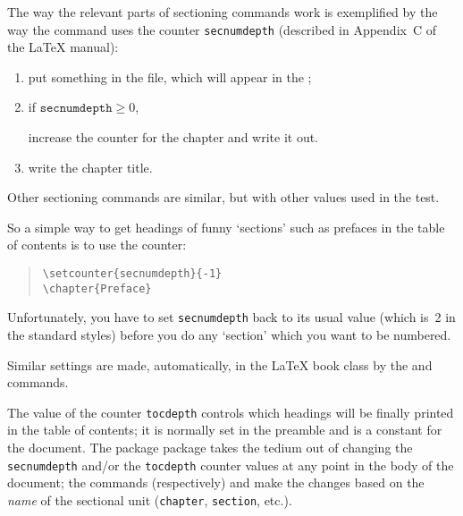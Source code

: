 
The way the relevant parts of sectioning commands work is exemplified
by the way the  command uses the counter \texttt{secnumdepth}
(described in Appendix~C of the \LaTeX{} manual):
\begin{enumerate}
\item put something in the  file, which will appear in
  the ;
\htmlignore 
\item if \ensuremath{\texttt{secnumdepth} \geq 0},
\endhtmlignore
{}
  increase the counter for the chapter and write it out.
\item write the chapter title.
\end{enumerate}
Other sectioning commands are similar, but with other values used in
the test.

So a simple way to get headings of funny `sections' such as prefaces
in the table of contents is to use the counter:
\begin{quote}
\begin{verbatim}
\setcounter{secnumdepth}{-1}
\chapter{Preface}
\end{verbatim}
\end{quote}
Unfortunately, you have to set \texttt{secnumdepth} back to its usual
value (which is~2 in the standard styles) before you do any `section'
which you want to be numbered.

Similar settings are made, automatically, in the \LaTeX{} book class by
the  and  commands.

The value of the counter \texttt{tocdepth} controls which headings
will be finally printed in the table of contents; it is normally set
in the preamble and is a constant for the document.  The package
 package takes the tedium out of changing the
\texttt{secnumdepth} and/or the \texttt{tocdepth} counter values at
any point in the body of the document; the commands (respectively)
 and  make the changes based on
the \emph{name} of the sectional unit (\texttt{chapter},
\texttt{section}, etc.\@).

